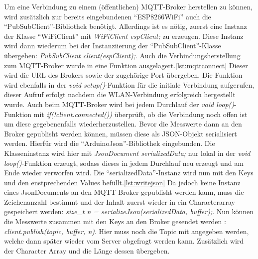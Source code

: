 Um eine Verbindung zu einem (öffentlichen) MQTT-Broker herstellen zu können, wird zusätzlich zur bereits eingebundenen "`ESP8266WiFi"' auch die "`PubSubClient"'-Bibliothek benötigt.
Allerdings ist es nötig, zuerst eine Instanz der Klasse "`WiFiClient"' mit \textit{WiFiClient espClient;} zu erzeugen.
Diese Instanz wird dann wiederum bei der Instanziierung der "`PubSubClient"'-Klasse übergeben: \textit{PubSubClient client(espClient);}.
Auch die Verbindungsherstellung zum MQTT-Broker wurde in eine Funktion ausgelagert.\ref{lst:mqttconnect}
Dieser wird die URL des Brokers sowie der zugehörige Port übergeben.
Die Funktion wird ebenfalls in der \textit{void setup()}-Funktion für die initiale Verbindung aufgerufen, dieser Aufruf erfolgt nachdem die WLAN-Verbindung erfolgreich hergestellt wurde.
Auch beim MQTT-Broker wird bei jedem Durchlauf der \textit{void loop()}-Funktion mit \textit{if(!client.connected())} überprüft, ob die Verbindung noch offen ist um diese gegebenenfalls wiederherzustellen.
Bevor die Messwerte dann an den Broker gepublisht werden können, müssen diese als JSON-Objekt serialisiert werden.
Hierfür wird die "`ArduinoJson"'-Bibliothek eingebunden.
Die Klasseninstanz wird hier mit \textit{JsonDocument serializedData;} nur lokal in der \textit{void loop()}-Funktion erzeugt, sodass dieses in jedem Durchlauf neu erzeugt und am Ende wieder verworfen wird.
Die "`serializedData"'-Instanz wird nun mit den Keys und den enstprechenden Values befüllt.\ref{lst:writejson}
Da jedoch keine Instanz eines JsonDocuments an den MQTT-Broker gepublisht werden kann, muss die Zeichenanzahl bestimmt und der Inhalt zuerst wieder in ein Characterarray gespeichert werden: \textit{size\_t n = serializeJson(serializedData, buffer);}.
Nun können die Messwerte zusammen mit den Keys an den Broker gesendet werden : \textit{client.publish(topic, buffer, n)}.
Hier muss noch die Topic mit angegeben werden, welche dann später wieder vom Server abgefragt werden kann.
Zusätzlich wird der Character Array und die Länge dessen übergeben.
